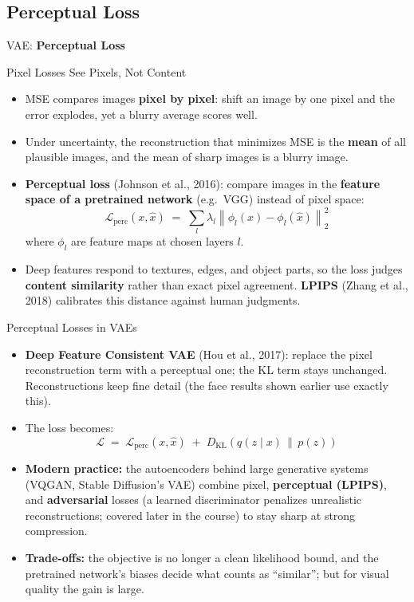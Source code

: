 \subsection{Perceptual Loss}
\begin{frame}{}
	\LARGE VAE: \textbf{Perceptual Loss}
\end{frame}

\begin{frame}{Pixel Losses See Pixels, Not Content}
\begin{itemize}
    \item MSE compares images \textbf{pixel by pixel}: shift an image by one pixel and the error explodes, yet a blurry average scores well.
    \item Under uncertainty, the reconstruction that minimizes MSE is the \textbf{mean} of all plausible images, and the mean of sharp images is a blurry image.
    \item \textbf{Perceptual loss} (Johnson et al., 2016): compare images in the \textbf{feature space of a pretrained network} (e.g.\ VGG) instead of pixel space:
    \[
    \mathcal{L}_{\mathrm{perc}}(x, \hat{x}) \;=\; \sum_{l} \lambda_l \left\| \phi_l(x) - \phi_l(\hat{x}) \right\|_2^2
    \]
    where $\phi_l$ are feature maps at chosen layers $l$.
    \item Deep features respond to textures, edges, and object parts, so the loss judges \textbf{content similarity} rather than exact pixel agreement. \textbf{LPIPS} (Zhang et al., 2018) calibrates this distance against human judgments.
\end{itemize}
\end{frame}

\begin{frame}{Perceptual Losses in VAEs}
\begin{itemize}
    \item \textbf{Deep Feature Consistent VAE} (Hou et al., 2017): replace the pixel reconstruction term with a perceptual one; the KL term stays unchanged. Reconstructions keep fine detail (the face results shown earlier use exactly this).
    \item The loss becomes:
    \[
    \mathcal{L} \;=\; \mathcal{L}_{\mathrm{perc}}(x, \hat{x}) \;+\; D_{\mathrm{KL}}\!\left( q(z \mid x) \,\|\, p(z) \right)
    \]
    \item \textbf{Modern practice:} the autoencoders behind large generative systems (VQGAN, Stable Diffusion's VAE) combine pixel, \textbf{perceptual (LPIPS)}, and \textbf{adversarial} losses (a learned discriminator penalizes unrealistic reconstructions; covered later in the course) to stay sharp at strong compression.
    \item \textbf{Trade-offs:} the objective is no longer a clean likelihood bound, and the pretrained network's biases decide what counts as ``similar''; but for visual quality the gain is large.
\end{itemize}
\end{frame}
